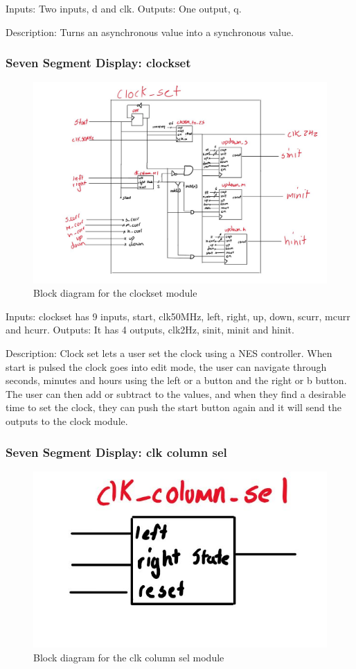 \documentclass[a4paper]{article}
\begin{document}
Inputs: Two inputs, d and clk.
Outputs: One output, q.

Description: Turns an asynchronous value into a synchronous value.

\subsubsection{Seven Segment Display: clockset}
\begin{figure}[H]
    \includegraphics[width=0.8 \linewidth]{images/clockset.JPG}
    \caption{Block diagram for the clockset module}
    \label{clockset}
\end{figure}

Inputs: clockset has 9 inputs, start, clk50MHz, left, right, up, down, scurr, mcurr and hcurr.
Outputs: It has 4 outputs, clk2Hz, sinit, minit and hinit.

Description: Clock set lets a user set the clock using a NES controller. When start is pulsed the clock goes into edit mode, the user can navigate through seconds, minutes and hours using the left or a button and the right or b button. The user can then add or subtract to the values, and when they find a desirable time to set the clock, they can push the start button again and it will send the outputs to the clock module.

\subsubsection{Seven Segment Display: clk column sel}
\begin{figure}[H]
    \includegraphics[width=0.8 \linewidth]{images/clkcolumnsel.JPG}
    \caption{Block diagram for the clk column sel module}
    \label{clkcolumnsel}
\end{figure}
\end{document}
